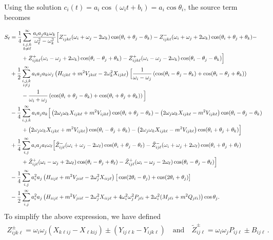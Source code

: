 \documentclass[letterpaper,11pt]{article}
\newcommand{\oi}{\omega_i}
\newcommand{\oj}{\omega_j}
\newcommand{\ok}{\omega_k}
\newcommand{\ol}{\omega_\ell}
\newcommand{\thi}{\theta_i}
\newcommand{\thj}{\theta_j}
\newcommand{\thk}{\theta_k}
\newcommand{\thl}{\theta_\ell}
\begin{document}
Using the solution $c_i(t) = a_i \cos (\oi t + b_i) = a_i \cos \theta_i$, the source term becomes

\begin{align}
S_\ell &=\frac{1}{4} \sum_{\substack{i,j,k \\ k \neq \ell}}^\infty \frac{a_i a_j a_k \ok}{\ol^2 - \ok^2} \Big[ Z^-_{ijk\ell} (\oi + \oj - 2\ok) \cos (\thi + \thj - \thk) - Z^-_{ijk\ell} (\oi + \oj + 2\ok) \cos (\thi + \thj + \thk) - \nonumber \\
%
&\qquad + Z^+_{ijk\ell} (\oi - \oj + 2\ok)  \cos(\thi - \thj + \thk) - Z^+_{ijk\ell} (\oi - \oj - 2\ok) \cos (\thi - \thj - \thk) \Big] \nonumber \\
%
& + \frac{1}{2}\sum_{\substack{i,j,k \\ i \neq j}}^\infty a_i a_j a_k \oj \left( H_{ijk\ell} + m^2 V_{jki\ell} - 2\ok^2 X_{ijk\ell} \right) \Big[ \frac{1}{\oi - \oj} \left( \cos (\thi - \thj - \thk)  + \cos(\thi - \thj + \thk) \right) \nonumber \\
%
& \qquad - \frac{1}{\oi + \oj} \left( \cos (\thi + \thj - \thk)  + \cos ( \thi + \thj + \thk) \right) \Big] \nonumber \\
%
& - \frac{1}{4} \sum_{i,j,k}^\infty a_i a_j a_k \Big[ \left( 2\oj \ok X_{ijk\ell} + m^2 V_{ijk\ell} \right)\cos(\thi + \thj - \thk) -  \left( 2\oj\ok X_{ijk\ell} - m^2 V_{ijk\ell} \right) \cos(\thi - \thj - \thk) \nonumber \\
%
& \qquad + \left(2\oj \ok X_{ijk\ell} + m^2 V_{ijk\ell} \right) \cos (\thi - \thj + \thk) - \left( 2\oj\ok X_{ijk\ell} - m^2 V_{ijk\ell} \right) \cos(\thi + \thj + \thk) \Big] \nonumber \\
%
& + \frac{1}{4} \sum_{i,j}^\infty a_i a_j a_\ell \ol \Big[ \tilde Z^-_{ij\ell} (\oi + \oj - 2\ol) \cos (\thi + \thj - \thl) - \tilde Z^-_{ij\ell} (\oi + \oj + 2\ol) \cos(\thi + \thj +  \thl) \nonumber \\
%
& \qquad + \tilde Z^+_{ij\ell} (\oi - \oj + 2\ol) \cos(\thi - \thj + \thl)  - \tilde Z^+_{ij\ell} (\oi - \oj - 2\ol) \cos( \thi - \thj - \thl)  \Big] \nonumber \\
%
& - \frac{1}{4} \sum_{i,j}^\infty a_i^2 a_j \left( H_{iij\ell} + m^2 V_{jii\ell} - 2\oj^2 X_{iij\ell} \right) \big[ \cos (2\thi - \thj) + \cos (2\thi + \thj) \big] \nonumber \\
%
& - \frac{1}{2} \sum_{i,j}^\infty a_i^2 a_j \left( H_{iij\ell} + m^2 V_{jii\ell} - 2\oj^2 X_{iij\ell} + 4\oi^2 \oj^2 P_{j\ell i} + 2\oi^2 (M_{j\ell i} + m^2 Q_{j\ell i}) \right) \cos \thj . \hspace{-0.2in}
\end{align} 
To simplify the above expression, we have defined
\begin{align}
Z^{\pm}_{ijk\ell} = \oi \oj \left( X_{k\ell ij} - X_{\ell kij} \right) \pm \left( Y_{ij\ell k} - Y_{ijk\ell} \right) \quad \text{and} \quad \tilde Z^{\pm}_{ij\ell} = \oi \oj P_{ij\ell} \pm B_{ij\ell} \, .
\end{align}
\end{document}
